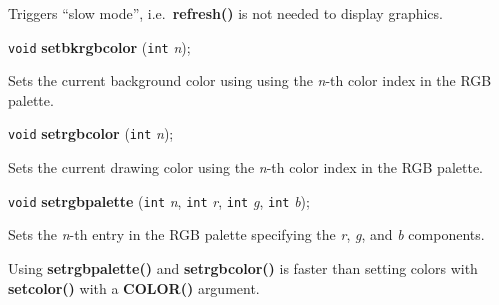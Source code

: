 \documentclass[a4paper,11pt]{article}
\newcommand{\V}{\texttt{void}}      %
\newcommand{\I}{\texttt{int}}       %
\newcommand{\func}[1]{\textbf{#1}}  %
\newcommand{\A}[1]{\emph{#1}}       %
\newenvironment{bgi}
{ %
  \begin{snugshade}
}
{ %
  \end{snugshade}
}
\begin{document}
Triggers ``slow mode'', i.e.\ \func{refresh()} is not needed to
display graphics.


\begin{bgi}
\V{} \func{setbkrgbcolor} (\I{} \A{n}); 
\end{bgi}

Sets the current background color using using the \A{n}-th color index
in the RGB palette.


\begin{bgi}
\V{} \func{setrgbcolor} (\I{} \A{n}); 
\end{bgi}

Sets the current drawing color using the \A{n}-th color index in the
RGB palette.


\begin{bgi}
\V{} \func{setrgbpalette} (\I{} \A{n}, \I{} \A{r}, \I{} \A{g}, \I{} \A{b}); 
\end{bgi}

Sets the \A{n}-th entry in the RGB palette specifying the \A{r},
\A{g}, and \A{b} components.

Using \func{setrgbpalette()} and \func{setrgbcolor()} is faster than
setting colors with \func{setcolor()} with a \func{COLOR()} argument.




\end{document}
